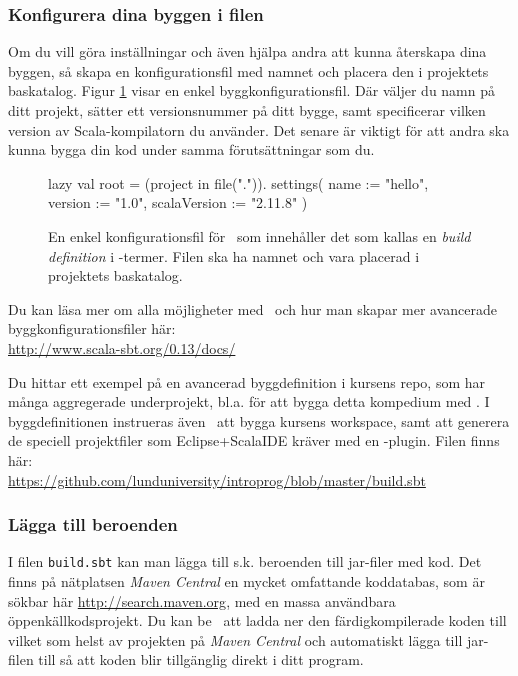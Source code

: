 \subsubsection{Konfigurera dina byggen i filen }

Om du vill göra inställningar och även hjälpa andra att kunna återskapa dina byggen, så skapa en konfigurationsfil med namnet  och placera den i projektets baskatalog. Figur \ref{fig:sbt:build-file} visar en enkel byggkonfigurationsfil. Där väljer du namn på ditt projekt, sätter ett versionsnummer på ditt bygge, samt specificerar vilken version av Scala-kompilatorn du använder. Det senare är viktigt för att andra ska kunna bygga din kod under samma förutsättningar som du. 

\begin{figure}[H]
\centering
\begin{Code}
lazy val root = (project in file(".")).
  settings(
    name := "hello",
    version := "1.0",
    scalaVersion := "2.11.8"
  )
\end{Code}
\caption{En enkel konfigurationsfil för \sbt\ som innehåller det som kallas en \textit{build definition} i \sbt-termer. Filen ska ha namnet  och vara placerad i projektets baskatalog.}
\label{fig:sbt:build-file}
\end{figure}

\noindent Du kan läsa mer om alla möjligheter med \sbt\ och hur man skapar mer avancerade byggkonfigurationsfiler här: \\
\url{http://www.scala-sbt.org/0.13/docs/}

Du hittar ett exempel på en avancerad byggdefinition i kursens repo, som har många aggregerade underprojekt, bl.a. för att bygga detta kompedium med . I byggdefinitionen instrueras även \sbt\ att bygga kursens workspace, samt att generera de speciell projektfiler som Eclipse+ScalaIDE kräver med en \sbt-plugin. Filen finns här: \\
\url{https://github.com/lunduniversity/introprog/blob/master/build.sbt}

\subsubsection{Lägga till beroenden}

I filen \texttt{build.sbt} kan man lägga till s.k. beroenden till jar-filer med kod. Det finns på nätplatsen \textit{Maven Central} en mycket omfattande koddatabas, som är sökbar här \url{http://search.maven.org}, med en massa användbara öppenkällkodsprojekt. Du kan be \sbt\ att ladda ner den färdigkompilerade koden till vilket som helst av projekten på \textit{Maven Central} och automatiskt lägga till jar-filen till  så att koden blir tillgänglig direkt i ditt program.

